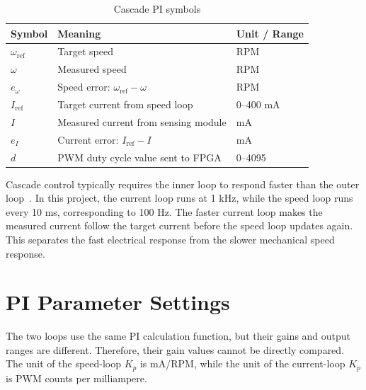 \documentclass[12pt, a4paper]{report}
\begin{document}
\begin{table}[H]
\centering
\caption{Cascade PI symbols}
\small
\begin{tabular}{@{}p{}p{}p{}@{}}
\toprule
Symbol & Meaning & Unit / Range \\
\midrule
\(\omega_{\mathrm{ref}}\) & Target speed & RPM \\
\(\omega\) & Measured speed & RPM \\
\(e_{\omega}\) & Speed error: \(\omega_{\mathrm{ref}}-\omega\) & RPM \\
\(I_{\mathrm{ref}}\) & Target current from speed loop & 0--400 mA \\
\(I\) & Measured current from sensing module & mA \\
\(e_I\) & Current error: \(I_{\mathrm{ref}}-I\) & mA \\
\(d\) & PWM duty cycle value sent to FPGA & 0--4095 \\
\bottomrule
\end{tabular}
\end{table}

Cascade control typically requires the inner loop to respond faster than the outer loop~\cite{astrom}. In this project, the current loop runs at 1 kHz, while the speed loop runs every 10 ms, corresponding to 100 Hz. The faster current loop makes the measured current follow the target current before the speed loop updates again. This separates the fast electrical response from the slower mechanical speed response.


\section{PI Parameter Settings}

The two loops use the same PI calculation function, but their gains and output ranges are different. Therefore, their gain values cannot be directly compared. The unit of the speed-loop \(K_p\) is mA/RPM, while the unit of the current-loop \(K_p\) is PWM counts per milliampere.
\end{document}

